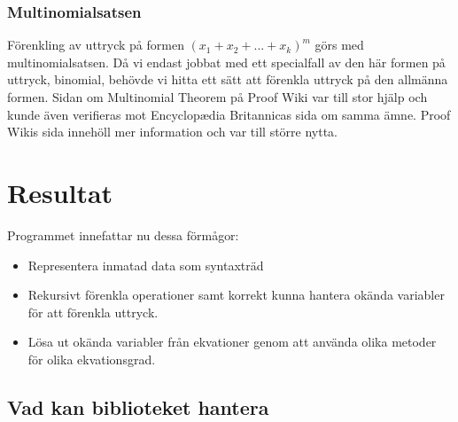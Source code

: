 \documentclass[12pt,a4paper]{article}
\begin{document}
\subsubsection{Multinomialsatsen}
Förenkling av uttryck på formen \((x_{1}+x_{2}+...+x_{k})^{m}\) görs med multinomialsatsen. Då vi endast jobbat med ett specialfall av den här formen på uttryck, binomial, behövde vi hitta ett sätt att förenkla uttryck på den allmänna formen. Sidan om Multinomial Theorem på Proof Wiki var till stor hjälp och kunde även verifieras mot Encyclopædia Britannicas sida om samma ämne. Proof Wikis sida innehöll mer information och var till större nytta.

\section{Resultat}
Programmet innefattar nu dessa förmågor:
\begin{itemize}
	\item Representera inmatad data som syntaxträd
	\item Rekursivt förenkla operationer samt korrekt kunna hantera okända variabler för att förenkla uttryck.
	\item Lösa ut okända variabler från ekvationer genom att använda olika metoder för olika ekvationsgrad.
\end{itemize}

\subsection{Vad kan biblioteket hantera}
\end{document}
